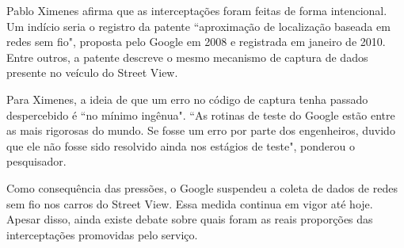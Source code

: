 Pablo Ximenes afirma que as interceptações foram feitas de forma intencional. Um indício seria o registro da patente ``aproximação de localização baseada em redes sem fio", proposta pelo Google em 2008 e registrada em janeiro de 2010. Entre outros, a patente descreve o mesmo mecanismo de captura de dados presente no veículo do Street View.

Para Ximenes, a ideia de que um erro no código de captura tenha passado despercebido é ``no mínimo ingênua". ``As rotinas de teste do Google estão entre as mais rigorosas do mundo. Se fosse um erro por parte dos engenheiros, duvido que ele não fosse sido resolvido ainda nos estágios de teste", ponderou o pesquisador.

Como consequência das pressões, o Google suspendeu a coleta de dados de redes sem fio nos carros do Street View. Essa medida continua em vigor até hoje. Apesar disso, ainda existe debate sobre quais foram as reais proporções das interceptações promovidas pelo serviço.
